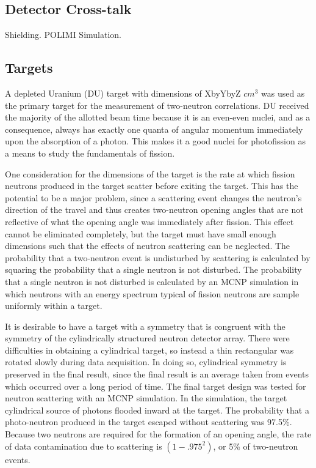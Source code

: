 \subsection{Detector Cross-talk}
Shielding.
POLIMI Simulation.

\subsection{Targets}
A depleted Uranium (DU) target with dimensions of XbyYbyZ $cm^3$ was used as the primary target for the measurement of two-neutron correlations. DU received the majority of the allotted beam time because it is an even-even nuclei, and as a consequence, always has exactly one quanta of angular momentum immediately upon the absorption of a photon. This makes it a good nuclei for photofission as a means to study the fundamentals of fission. 

One consideration for the dimensions of the target is the rate at which fission neutrons produced in the target scatter before exiting the target. This has the potential to be a major problem, since a scattering event changes the neutron's direction of the travel and thus creates two-neutron opening angles that are not reflective of what the opening angle was immediately after fission. This effect cannot be eliminated completely, but the target must have small enough dimensions such that the effects of neutron scattering can be neglected. The probability that a two-neutron event is undisturbed by scattering is calculated by squaring the probability that a single neutron is not disturbed. The probability that a single neutron is not disturbed is calculated by an MCNP simulation in which neutrons with an energy spectrum typical of fission neutrons are sample uniformly within a target.

It is desirable to have a target with a symmetry that is congruent with the symmetry of the cylindrically structured neutron detector array. There were difficulties in obtaining a cylindrical target, so instead a thin rectangular was rotated slowly during data acquisition. In doing so, cylindrical symmetry is preserved in the final result, since the final result is an average taken from events which occurred over a long period of time. 
The final target design was tested for neutron scattering with an MCNP simulation. In the simulation, the target cylindrical source of photons flooded inward at the target. The probability that a photo-neutron produced in the target escaped without scattering was 97.5\%. Because two neutrons are required for the formation of an opening angle, the rate of data contamination due to scattering is $(1-.975^2)$, or 5\% of two-neutron events.  

